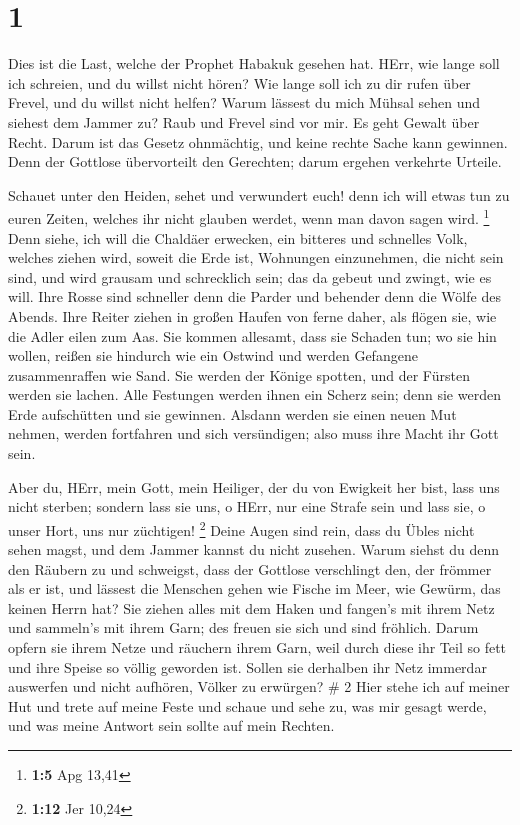 \hypertarget{section}{%
\section{1}\label{section}}

 Dies ist die Last, welche der Prophet Habakuk gesehen hat.
 HErr, wie lange soll ich schreien, und du willst nicht
hören? Wie lange soll ich zu dir rufen über Frevel, und du willst nicht
helfen?  Warum lässest du mich Mühsal sehen und siehest dem
Jammer zu? Raub und Frevel sind vor mir. Es geht Gewalt über Recht.
 Darum ist das Gesetz ohnmächtig, und keine rechte Sache
kann gewinnen. Denn der Gottlose übervorteilt den Gerechten; darum
ergehen verkehrte Urteile.

 Schauet unter den Heiden, sehet und verwundert euch! denn
ich will etwas tun zu euren Zeiten, welches ihr nicht glauben werdet,
wenn man davon sagen wird. \footnote{\textbf{1:5} Apg 13,41}
 Denn siehe, ich will die Chaldäer erwecken, ein bitteres
und schnelles Volk, welches ziehen wird, soweit die Erde ist, Wohnungen
einzunehmen, die nicht sein sind,  und wird grausam und
schrecklich sein; das da gebeut und zwingt, wie es will. 
Ihre Rosse sind schneller denn die Parder und behender denn die Wölfe
des Abends. Ihre Reiter ziehen in großen Haufen von ferne daher, als
flögen sie, wie die Adler eilen zum Aas.  Sie kommen
allesamt, dass sie Schaden tun; wo sie hin wollen, reißen sie hindurch
wie ein Ostwind und werden Gefangene zusammenraffen wie Sand.
 Sie werden der Könige spotten, und der Fürsten werden sie
lachen. Alle Festungen werden ihnen ein Scherz sein; denn sie werden
Erde aufschütten und sie gewinnen.  Alsdann werden sie
einen neuen Mut nehmen, werden fortfahren und sich versündigen; also
muss ihre Macht ihr Gott sein.

 Aber du, HErr, mein Gott, mein Heiliger, der du von
Ewigkeit her bist, lass uns nicht sterben; sondern lass sie uns, o HErr,
nur eine Strafe sein und lass sie, o unser Hort, uns nur züchtigen!
\footnote{\textbf{1:12} Jer 10,24}  Deine Augen sind rein,
dass du Übles nicht sehen magst, und dem Jammer kannst du nicht zusehen.
Warum siehst du denn den Räubern zu und schweigst, dass der Gottlose
verschlingt den, der frömmer als er ist,  und lässest die
Menschen gehen wie Fische im Meer, wie Gewürm, das keinen Herrn hat?
 Sie ziehen alles mit dem Haken und fangen's mit ihrem Netz
und sammeln's mit ihrem Garn; des freuen sie sich und sind fröhlich.
 Darum opfern sie ihrem Netze und räuchern ihrem Garn, weil
durch diese ihr Teil so fett und ihre Speise so völlig geworden ist.
 Sollen sie derhalben ihr Netz immerdar auswerfen und nicht
aufhören, Völker zu erwürgen? \# 2  Hier stehe ich auf
meiner Hut und trete auf meine Feste und schaue und sehe zu, was mir
gesagt werde, und was meine Antwort sein sollte auf mein Rechten.

